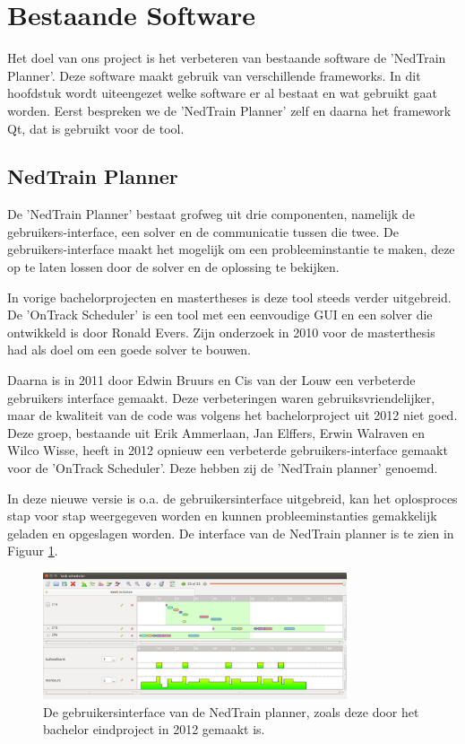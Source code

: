 \section{Bestaande Software}
Het doel van ons project is het verbeteren van bestaande software de 'NedTrain Planner'. Deze software maakt gebruik van verschillende frameworks. In dit hoofdstuk wordt uiteengezet welke software er al bestaat en wat gebruikt gaat worden. Eerst bespreken we de 'NedTrain Planner' zelf en daarna het framework Qt, dat is gebruikt voor de tool.

\subsection{NedTrain Planner}
\label{subsec:planner}
De 'NedTrain Planner' bestaat grofweg uit drie componenten, namelijk de gebruikers-interface, een solver en de communicatie tussen die twee. De gebruikers-interface maakt het mogelijk om een probleeminstantie te maken, deze op te laten lossen door de solver en de oplossing te bekijken.

In vorige bachelorprojecten en mastertheses is deze tool steeds verder uitgebreid. De 'OnTrack Scheduler' is een tool met een eenvoudige GUI en een solver die ontwikkeld is door Ronald Evers. Zijn onderzoek in 2010 voor de masterthesis had als doel om een goede solver te bouwen. \cite{ronaldevers2010}

Daarna is in 2011 door Edwin Bruurs en Cis van der Louw een verbeterde gebruikers interface gemaakt.\cite{bep2011nedtrain} Deze verbeteringen waren gebruiksvriendelijker, maar de kwaliteit van de code was volgens het bachelorproject uit 2012 niet goed.\cite{bep2012nedtrain} Deze groep, bestaande uit Erik Ammerlaan, Jan Elffers, Erwin Walraven en Wilco Wisse, heeft in 2012 opnieuw een verbeterde gebruikers-interface gemaakt voor de 'OnTrack Scheduler'. Deze hebben zij de 'NedTrain planner' genoemd.

In deze nieuwe versie is o.a. de gebruikersinterface uitgebreid, kan het oplosproces stap voor stap weergegeven worden en kunnen probleeminstanties gemakkelijk geladen en opgeslagen worden. De interface van de NedTrain planner is te zien in Figuur \ref{fig:plannergui}.

\begin{figure}[!h]
\label{fig:plannergui}
\centering
\includegraphics[width=0.8\textwidth]{../images/plannergui.png}
\caption{De gebruikersinterface van de NedTrain planner, zoals deze door het bachelor eindproject in 2012 gemaakt is.}
\end{figure}

